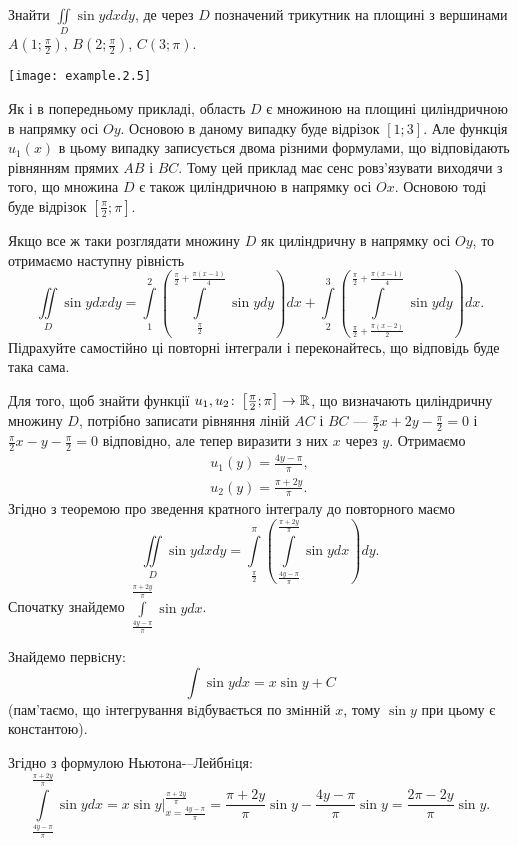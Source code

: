 \begin{example}
Знайти ${\iint\limits_D \sin y d x d y}$, де через $D$ позначений трикутник на площині з вершинами ${A\left(1;\frac{\pi}{2}\right)}$, ${B\left(2;\frac{\pi}{2}\right)}$, ${C\left(3;\pi\right)}$.

\texttt{[image: example.2.5]}

Як і в попередньому прикладі, область $D$ є множиною на площині циліндричною в напрямку осі ${Oy}$. Основою в даному випадку буде відрізок ${\left[1;3\right]}$. Але функція ${u_1(x)}$ в цьому випадку записується двома різними формулами, що відповідають рівнянням прямих ${AB}$ і ${BC}$. Тому цей приклад має сенс ровз'язувати виходячи з того, що множина $D$ є також циліндричною в напрямку осі ${Ox}$. Основою тоді буде відрізок ${\left[\frac{\pi}{2};\pi\right]}$.
\begin{remark}
Якщо все ж таки розглядати множину $D$ як циліндричну в напрямку осі ${Oy}$, то отримаємо наступну рівність
\[
\iint\limits_D \sin y d x d y = \int\limits_{1}^{2}\left(\int\limits_{\frac{\pi}{2}}^{\frac{\pi}{2}+\frac{\pi  \left(x-1\right)}{4}}\sin y dy\right) dx+\int\limits_{2}^{3}\left(\int\limits_{\frac{\pi}{2}+\frac{\pi  \left(x-2\right)}{2}}^{\frac{\pi}{2}+\frac{\pi  \left(x-1\right)}{4}}\sin y dy\right) dx.
\]
Підрахуйте самостійно ці повторні інтеграли і переконайтесь, що відповідь буде така сама.
\end{remark}
Для того, щоб знайти функції ${u_1, u_2\colon \left[\frac{\pi}{2};\pi\right]\to \mathbb{R}}$, що визначають циліндричну множину $D$, потрібно записати рівняння ліній ${AC}$ і ${BC}$ --- ${\frac{\pi}{2}  x+2 y-\frac{\pi}{2} =0}$ і ${\frac{\pi}{2}  x-y-\frac{\pi}{2} =0}$ відповідно, але тепер виразити з них $x$ через $y$. Отримаємо
\[
\begin{array}{l}
u_1(y) = \frac{4 y - \pi}{\pi},\\ u_2(y) = \frac{\pi +2 y}{\pi}.
\end{array}
\]
Згідно з теоремою про зведення кратного інтегралу до повторного маємо
\[
\iint\limits_D \sin y d x d y = \int\limits_{\frac{\pi}{2}}^{\pi}\left(\int\limits_{\frac{4 y - \pi}{\pi}}^{\frac{\pi +2 y}{\pi}}\sin ydx\right) dy.
\]
Спочатку знайдемо ${\int\limits_{\frac{4 y - \pi}{\pi}}^{\frac{\pi +2 y}{\pi}}\sin ydx}$.

Знайдемо первiсну:
\[
\int \sin y dx = x\sin y + C
\]
(пам’таємо, що iнтегрування вiдбувається по змiннiй ${x}$, тому ${\sin y}$ при цьому є константою).

Згідно з формулою Ньютона-–Лейбнiця:
\[
\int\limits_{\frac{4 y - \pi}{\pi}}^{\frac{\pi +2 y}{\pi}}\sin ydx = x \sin y\biggr|_{x = \frac{4 y - \pi}{\pi}}^{\frac{\pi +2 y}{\pi}} = \frac{\pi +2 y}{\pi}\sin y - \frac{4 y - \pi}{\pi}\sin y = \frac{2\pi - 2 y}{\pi}\sin y.
\]


\end{example}
